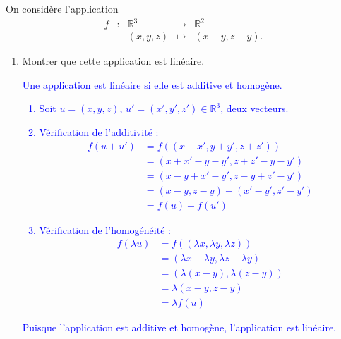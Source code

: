 \documentclass[a4paper,12pt]{article}
\def\R{\mathbb{R}}
\newcommand{\add}[1]{\textcolor{blue}{#1}}
\begin{document}
\bigskip

\begin{exercice}
    On considère l'application
    $$\begin{array}{ccccc}
        f & : & \R^3 & \to & \R^2 \\
          &   & (x,y,z) & \mapsto & (x-y,z-y).
      \end{array}
    $$
    \begin{enumerate} 
        \item Montrer que cette application est linéaire.
            \newline
            \add{
                Une application est linéaire si elle est additive et homogène.
                \begin{enumerate}
                    \item Soit $u=(x, y, z)$, $u'=(x', y', z') \in \R^3$, deux vecteurs.
                    \item Vérification de l'additivité :
                        \begin{align*}
                            f(u+u') &= f((x+x',y+y',z+z'))\\
                                    &= (x+x'-y-y', z+z'-y-y')\\
                                    &= (x-y+x'-y', z-y+z'-y')\\
                                    &= (x-y,z-y) + (x'-y',z'-y')\\
                                    &= f(u) + f(u')
                        \end{align*}
                    \item Vérification de l'homogénéité : 
                        \begin{align*}
                            f(\lambda u) &= f((\lambda x, \lambda y, \lambda z))\\
                                         &= (\lambda x-\lambda y,\lambda z-\lambda y)\\
                                         &= (\lambda (x-y), \lambda (z-y))\\
                                         &= \lambda (x-y, z-y)\\
                                         &= \lambda f(u)
                        \end{align*}
                \end{enumerate}
                Puisque l'application est additive et homogène, l'application est linéaire.
            }


\end{enumerate}
\end{exercice}
\end{document}
